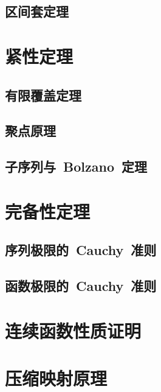 \subsection{区间套定理}
\begin{exercise}
\item
\end{exercise}
\section{紧性定理}
\subsection{有限覆盖定理}
\subsection{聚点原理}
\subsection{子序列与~Bolzano~定理}
\begin{exercise}
\item
\end{exercise}
\section{完备性定理}
\subsection{序列极限的~Cauchy~准则}
\subsection{函数极限的~Cauchy~准则}
\begin{exercise}
\item
\end{exercise}
\section{连续函数性质证明}
\begin{exercise}
\item
\end{exercise}
\section{压缩映射原理}
\begin{exercise}
\item
\end{exercise}
